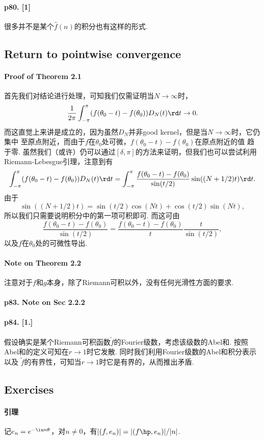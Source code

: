   \paragraph{p80. [1]}
    很多并不是某个$\hat{f}(n)$的积分也有这样的形式.

\subsection{Return to pointwise convergence}
  \paragraph{Proof of Theorem 2.1}
    首先我们对结论进行处理，可知我们仅需证明当$N\to\infty$时，
    \[
      \frac{1}{2\pi}\int_{-\pi}^\pi (f(\theta_0-t)-f(\theta_0))D_N(t)\rd t\to 0.
    \]
    而这直觉上来讲是成立的，因为虽然$D_N$并非good kernel，但是当$N\to\infty$时，它仍集中
    至原点附近，而由于$f$在$\theta_0$处可微，$f(\theta_0-t)-f(\theta_0)$在原点附近的值
    趋于零. 虽然我们（或许）仍可以通过$[\delta,\pi]$的方法来证明，但我们也可以尝试利用
    Riemann-Lebesgue引理，注意到有
    \[\begin{split}
      \int_{-\pi}^\pi (f(\theta_0-t)-f(\theta_0))D_N(t)\rd t
      = \int_{-\pi}^\pi \frac{f(\theta_0-t)-f(\theta_0)}{\sin(t/2)}
        \sin((N+1/2)t)\rd t.
    \end{split}\]
    由于
    \[
      \sin((N+1/2)t) = \sin(t/2)\cos(Nt) + \cos(t/2)\sin(Nt),
    \]
    所以我们只需要说明积分中的第一项可积即可. 而这可由
    \[
      \frac{f(\theta_0-t)-f(\theta_0)}{\sin(t/2)} =
      \frac{f(\theta_0-t)-f(\theta_0)}{t}\frac{t}{\sin(t/2)},
    \]
    以及$f$在$\theta_0$处的可微性导出.

  \paragraph{Note on Theorem 2.2}
    注意对于$f$和$g$本身，除了Riemann可积以外，没有任何光滑性方面的要求. 

  \paragraph{p83. Note on Sec 2.2.2}
    

  \paragraph{p84. [1.]}
    假设确实是某个Riemann可积函数$\tilde{f}$的Fourier级数，考虑该级数的Abel和. 按照
    Abel和的定义可知在$r\to 1$时它发散. 同时我们利用Fourier级数的Abel和积分表示以及
    $\tilde{f}$的有界性，可知当$r\to 1$时它是有界的，从而推出矛盾.


\subsection{Exercises}
  \paragraph{引理}
    记$e_n=e^{-\iu n\theta}$，对$n\ne 0$，有$|(f,e_n)|=|(f\hp,e_n)|/|n|$.




